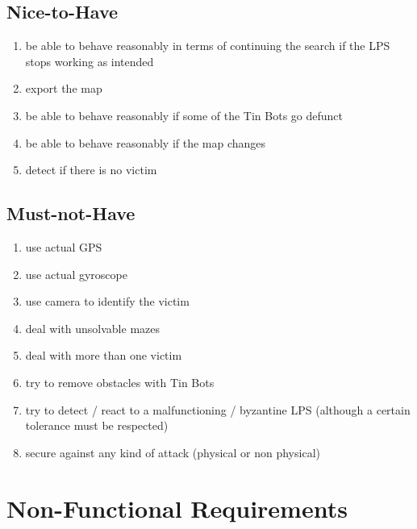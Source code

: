 \documentclass[a4paper,parskip,headheight=38pt]{scrartcl} %
\begin{document}
\subsection{Nice-to-Have}
\begin{enumerate}[label=\nicetohave,ref=\nicetohave]
\item be able to behave reasonably in terms of continuing the search if the LPS stops working as intended\label{req:missLPS}
\item export the map
\item be able to behave reasonably if some of the Tin Bots go defunct \label{req:puckFault}
\item be able to behave reasonably if the map changes \label{req:mapChange}
\item detect if there is no victim
\end{enumerate}

\subsection{Must-not-Have}
\begin{enumerate}[label=\mustnothave]
\item use actual GPS
\item use actual gyroscope
\item use camera to identify the victim
\item deal with unsolvable mazes
\item deal with more than one victim
\item try to remove obstacles with Tin Bots
\item try to detect / react to a malfunctioning / byzantine LPS (although a certain tolerance must be respected)
\item secure against any kind of attack (physical or non physical)
\end{enumerate}

\section{Non-Functional Requirements}
\end{document}
